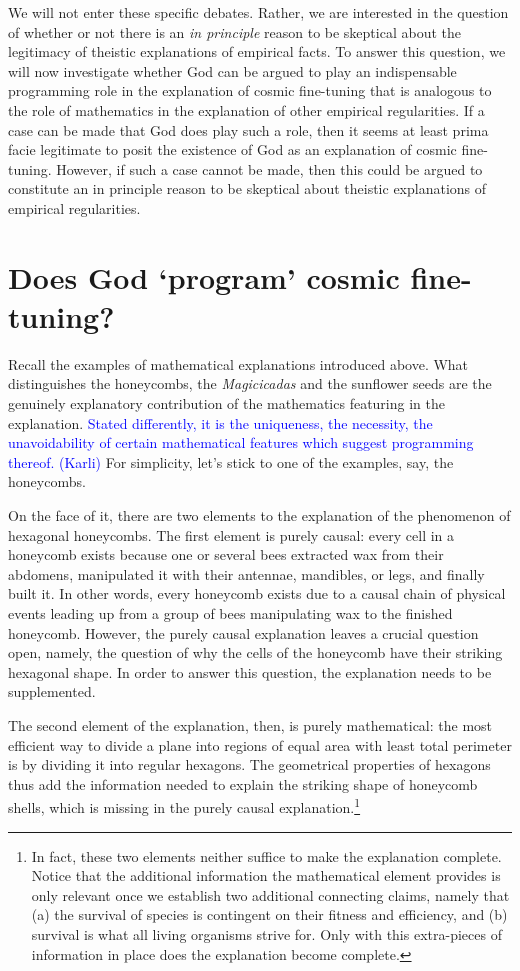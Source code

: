 \documentclass[a4paper,12pt]{article}
\newcommand{\karli}[1]{\textcolor{blue}{#1 (Karli)}}
\begin{document}
We will not enter these specific debates. Rather, we are interested in the question of whether or not there is an \textit{in principle} reason to be skeptical about the legitimacy of theistic explanations of empirical facts. To answer this question, we will now investigate whether God can be argued to play an indispensable programming role in the explanation of cosmic fine-tuning that is analogous to the role of mathematics in the explanation of other empirical regularities. If a case can be made that God does play such a role, then it seems at least prima facie legitimate to posit the existence of God as an explanation of cosmic fine-tuning. However, if such a case cannot be made, then this could be argued to constitute an in principle reason to be skeptical about theistic explanations of empirical regularities.

\section{Does God `program' cosmic fine-tuning?}

Recall the examples of mathematical explanations introduced above.
What distinguishes the honeycombs, the \textit{Magicicadas}
and the sunflower seeds are the genuinely explanatory contribution of the mathematics featuring in the explanation.
\karli{
Stated differently, it is the uniqueness, the necessity, the unavoidability of certain mathematical features which
suggest programming thereof.
}
For simplicity, let's stick to one of the examples, say, the honeycombs.

On the face of it, there are two elements to the explanation of the phenomenon of hexagonal honeycombs. The first element is purely causal: every cell in a honeycomb exists because one or several bees extracted wax from their abdomens, manipulated it with their antennae, mandibles, or legs, and finally built it. In other words, every honeycomb exists due to a causal chain of physical events leading up from a group of bees manipulating wax to the finished honeycomb. However, the purely causal explanation leaves a crucial question open, namely, the question of why the cells of the honeycomb have their striking hexagonal shape. In order to answer this question, the explanation needs to be supplemented.

The second element of the explanation, then, is purely mathematical: the most efficient way to divide a plane into regions of equal area with least total perimeter is by dividing it into regular hexagons. The geometrical properties of hexagons thus add the information needed to explain the striking shape of honeycomb shells, which is missing in the purely causal explanation.\footnote{In fact, these two elements neither suffice to make the explanation complete. Notice that the additional information the mathematical element provides is only relevant once we establish two additional connecting claims, namely that (a) the survival of species is contingent on their fitness and efficiency, and (b) survival is what all living organisms strive for. Only with this extra-pieces of information in place does the explanation become complete.}
\end{document}
